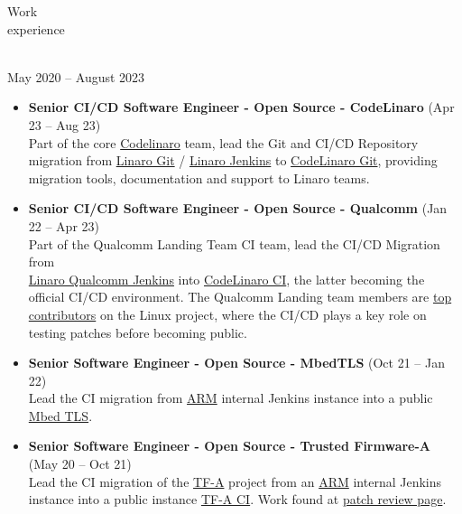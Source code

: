 \documentclass{resume}
\def\linaro{Linaro Limited}
\begin{document}
\begin{category}{Work \\experience}

  \citem{\linaro}\\
  May 2020 -- August 2023

  \begin{itemize}
  \item \textbf{Senior CI/CD Software Engineer - Open Source - CodeLinaro} (Apr 23 -- Aug 23)\\
    Part of the core \href{www.codelinaro.org}{Codelinaro} team, lead the Git and CI/CD Repository migration
    from \href{https://git.linaro.org}{Linaro Git} / \href{https://ci.linaro.org}{Linaro Jenkins} to
    \href{https://git.codelinaro.org}{CodeLinaro Git}, providing migration tools, documentation and support to Linaro teams.
  \end{itemize}

  \begin{itemize}
  \item \textbf{Senior CI/CD Software Engineer - Open Source - Qualcomm} (Jan 22 -- Apr 23)\\
    Part of the Qualcomm Landing Team CI team, lead the CI/CD Migration from \\
    \href{https://ci.linaro.org/view/qclt/}{Linaro Qualcomm Jenkins} into
    \href{https://git.codelinaro.org/linaro/qcomlt/ci/configs}{CodeLinaro CI}, the latter becoming the official CI/CD environment.
    The Qualcomm Landing team members are \href{https://kernelnewbies.org/DevelopmentStatistics}{top contributors} on the Linux project,
    where the CI/CD plays a key role on testing patches before becoming public.
  \end{itemize}

  \begin{itemize}
  \item \textbf{Senior Software Engineer - Open Source - MbedTLS} (Oct 21 -- Jan 22)\\
    Lead the CI migration from \href{https://www.arm.com/}{ARM} internal Jenkins instance into a public \href{https://github.com/ARMmbed/mbedtls}{Mbed TLS}.
  \end{itemize}

  \begin{itemize}
  \item \textbf{Senior Software Engineer - Open Source - Trusted Firmware-A} (May 20 -- Oct 21)\\
    Lead the CI migration of the \href{https://www.trustedfirmware.org/projects/tf-a/}{TF-A}
    project from an \href{https://www.arm.com/}{ARM} internal Jenkins instance into a public instance \href{https://ci.trustedfirmware.org/}{TF-A CI}.
    Work found at \href{https://review.trustedfirmware.org/q/owner:leonardo.sandoval%2540linaro.org}{patch review page}.
  \end{itemize}


\end{category}
\end{document}
